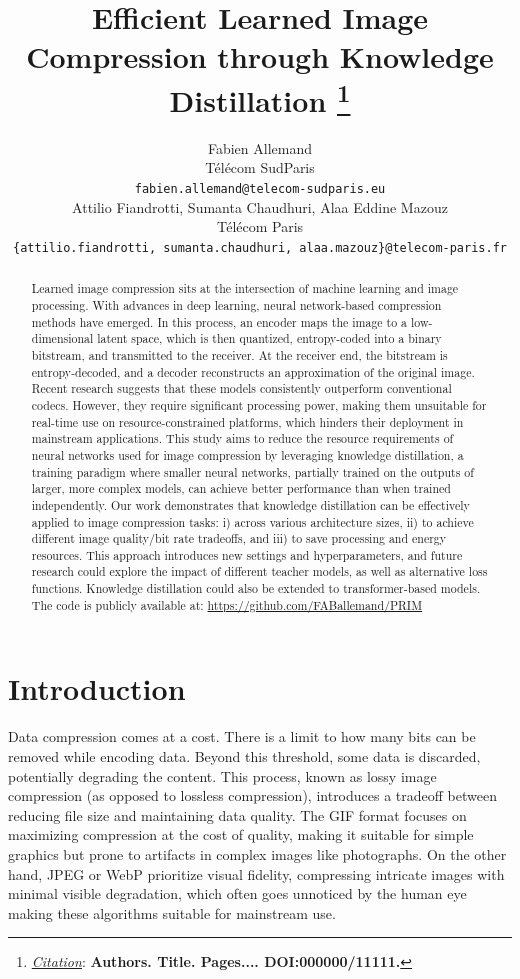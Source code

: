 \documentclass{article}
\title{Efficient Learned Image Compression through Knowledge Distillation
\thanks{\textit{\underline{Citation}}: 
\textbf{Authors. Title. Pages.... DOI:000000/11111.}} 
}
\author{
	Fabien Allemand\\
	Télécom SudParis\\
	\texttt{fabien.allemand@telecom-sudparis.eu}\\
	\And
	Attilio Fiandrotti, Sumanta Chaudhuri, Alaa Eddine Mazouz\\
	Télécom Paris\\
	\texttt{\{attilio.fiandrotti, sumanta.chaudhuri, alaa.mazouz\}@telecom-paris.fr}\\
}
\begin{document}
\maketitle

\begin{abstract}
	Learned image compression sits at the intersection of machine learning and image processing. With advances in deep learning, neural network-based compression methods have emerged. In this process, an encoder maps the image to a low-dimensional latent space, which is then quantized, entropy-coded into a binary bitstream, and transmitted to the receiver. At the receiver end, the bitstream is entropy-decoded, and a decoder reconstructs an approximation of the original image. Recent research suggests that these models consistently outperform conventional codecs. However, they require significant processing power, making them unsuitable for real-time use on resource-constrained platforms, which hinders their deployment in mainstream applications. This study aims to reduce the resource requirements of neural networks used for image compression by leveraging knowledge distillation, a training paradigm where smaller neural networks, partially trained on the outputs of larger, more complex models, can achieve better performance than when trained independently. Our work demonstrates that knowledge distillation can be effectively applied to image compression tasks: i) across various architecture sizes, ii) to achieve different image quality/bit rate tradeoffs, and iii) to save processing and energy resources. This approach introduces new settings and hyperparameters, and future research could explore the impact of different teacher models, as well as alternative loss functions. Knowledge distillation could also be extended to transformer-based models. The code is publicly available at: \url{https://github.com/FABallemand/PRIM}
\end{abstract}


\section{Introduction}
Data compression comes at a cost. There is a limit to how many bits can be removed while encoding data. Beyond this threshold, some data is discarded, potentially degrading the content. This process, known as lossy image compression (as opposed to lossless compression), introduces a tradeoff between reducing file size and maintaining data quality. The GIF format focuses on maximizing compression at the cost of quality, making it suitable for simple graphics but prone to artifacts in complex images like photographs. On the other hand, JPEG or WebP prioritize visual fidelity, compressing intricate images with minimal visible degradation, which often goes unnoticed by the human eye making these algorithms suitable for mainstream use.
\end{document}
